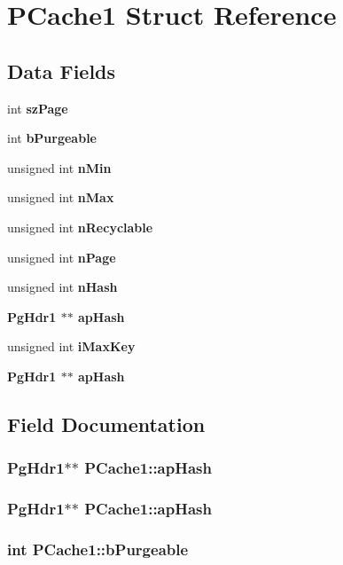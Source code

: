 \section{PCache1 Struct Reference}
\label{structPCache1}
\subsection*{Data Fields}
\begin{CompactItemize}
\item 
int \bf{sz\-Page}
\item 
int \bf{b\-Purgeable}
\item 
unsigned int \bf{n\-Min}
\item 
unsigned int \bf{n\-Max}
\item 
unsigned int \bf{n\-Recyclable}
\item 
unsigned int \bf{n\-Page}
\item 
unsigned int \bf{n\-Hash}
\item 
\bf{Pg\-Hdr1} $\ast$$\ast$ \bf{ap\-Hash}
\item 
unsigned int \bf{i\-Max\-Key}
\item 
\bf{Pg\-Hdr1} $\ast$$\ast$ \bf{ap\-Hash}
\end{CompactItemize}


\subsection{Field Documentation}
\subsubsection{\setlength{\rightskip}{0pt plus 5cm}\bf{Pg\-Hdr1}$\ast$$\ast$ \bf{PCache1::ap\-Hash}}\label{structPCache1_38d11fe6fba69f2710f3a231848e7a8a}


\subsubsection{\setlength{\rightskip}{0pt plus 5cm}\bf{Pg\-Hdr1}$\ast$$\ast$ \bf{PCache1::ap\-Hash}}\label{structPCache1_38d11fe6fba69f2710f3a231848e7a8a}


\subsubsection{\setlength{\rightskip}{0pt plus 5cm}int \bf{PCache1::b\-Purgeable}}\label{structPCache1_f580942ef0541b6a4909d183c498594f}


